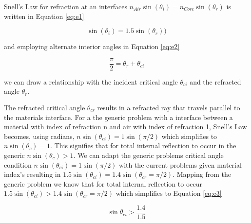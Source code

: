 \documentclass[main.tex]{subfiles}
\begin{document}
Snell's Law for refraction at an interfaces $n_{Air}\sin(\theta_i) = n_{Core}\sin(\theta_{r})$ is written in Equation  \ref{eq:e1}

\begin{equation}\label{eq:e1}
\sin(\theta_i) = 1.5\sin(\theta_{r}))
\end{equation}

and employing alternate interior angles in Equation \ref{eq:e2}

\begin{equation}\label{eq:e2}
\frac{\pi}{2} = \theta_{r} + \theta_{ci}
\end{equation}

we can draw a relationship with the incident critical angle $\theta_{ci}$ and the refracted angle $\theta_{r}$.

The refracted critical angle $\theta_{cr}$ results in a refracted ray that travels parallel to the materials interface. For a the generic problem with a interface between a material with index of refraction n and air with index of refraction 1, Snell's Law becomes, using radians, $n\sin(\theta_{ci}) = 1\sin(\pi/2)$ which simplifies to $n\sin(\theta_c) = 1$. This signifies that for total internal reflection to occur in the generic  $n\sin(\theta_c) > 1$. We can adapt the generic problems critical angle condition $n\sin(\theta_{ci}) = 1\sin(\pi/2)$ with the current problems given material index's resulting in  $1.5\sin(\theta_{ci}) = 1.4\sin(\theta_{cr} = \pi/2)$. Mapping from the generic problem we know that for total internal reflection to occur $1.5\sin(\theta_{ci}) > 1.4\sin(\theta_{cr} = \pi/2)$ which simplifies to Equation \ref{eq:e3} 

\begin{equation}\label{eq:e3}
\sin\theta_{ci} > \frac{1.4}{1.5}
\end{equation}


\end{document}
